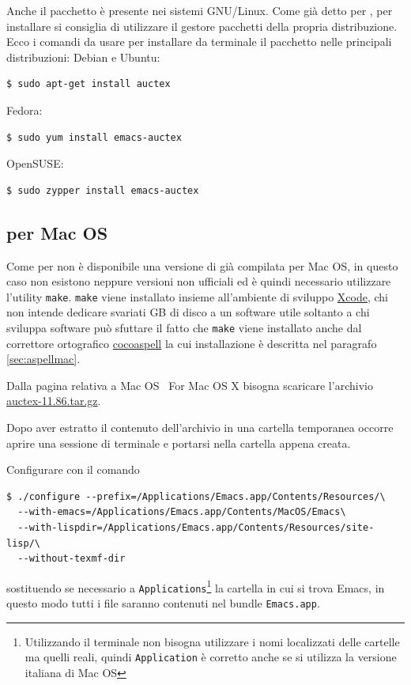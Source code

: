 \documentclass[11pt,a4paper]{article}
\begin{document}
Anche il pacchetto \auctex{} è presente nei sistemi GNU/Linux. Come già detto
per \emacs, per installare \auctex{} si consiglia di utilizzare il gestore
pacchetti della propria distribuzione. Ecco i comandi da usare per installare da
terminale il pacchetto nelle principali distribuzioni: Debian e Ubuntu:
\begin{Verbatim}
$ sudo apt-get install auctex
\end{Verbatim}
Fedora:
\begin{Verbatim}
$ sudo yum install emacs-auctex
\end{Verbatim}
OpenSUSE:
\begin{Verbatim}
$ sudo zypper install emacs-auctex
\end{Verbatim}


\subsection{\auctex{} per Mac OS}
\label{sec:auctexmac}

Come per \emacs{} non è disponibile una versione di \auctex{} già compilata per
Mac OS, in questo caso non esistono neppure versioni non ufficiali ed è quindi
necessario utilizzare l'utility \texttt{make}.  \texttt{make} viene installato
insieme all'ambiente di sviluppo
\href{http://developer.apple.com/technologies/tools/whats-new.html}%
{Xcode}, chi non intende dedicare svariati GB di disco a un software utile
soltanto a chi sviluppa software può sfuttare il fatto che \texttt{make} viene
installato anche dal correttore ortografico
\href{http://cocoaspell.leuski.net/}{cocoaspell} la cui installazione è
descritta nel paragrafo \ref{sec:aspellmac}.

Dalla pagina relativa a Mac OS
%
{\auctex\ For Mac OS X} bisogna scaricare l'archivio
\href{http://ftp.gnu.org/pub/gnu/auctex/auctex-11.86.tar.gz}%
{auctex-11.86.tar.gz}.

Dopo aver estratto il contenuto dell'archivio in una cartella temporanea occorre
aprire una sessione di terminale e portarsi nella cartella appena creata.

Configurare \auctex{} con il comando
\begin{Verbatim}
$ ./configure --prefix=/Applications/Emacs.app/Contents/Resources/\
  --with-emacs=/Applications/Emacs.app/Contents/MacOS/Emacs\
  --with-lispdir=/Applications/Emacs.app/Contents/Resources/site-lisp/\
  --without-texmf-dir
\end{Verbatim}
sostituendo se necessario a \texttt{Applications}\footnote{Utilizzando il
  terminale non bisogna utilizzare i nomi localizzati delle cartelle ma quelli
  reali, quindi \texttt{Application} è corretto anche se si utilizza la versione
  italiana di Mac OS} la cartella in cui si trova Emacs, in questo modo tutti i
file saranno contenuti nel bundle \texttt{Emacs.app}.
\end{document}
